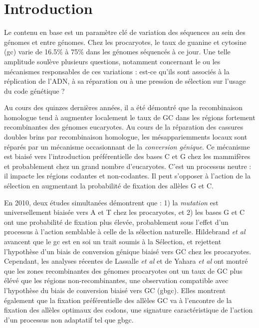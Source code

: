 \section*{Introduction}
\label{sec:introduction}

Le contenu en base est un paramètre clé de variation des séquences au sein des
génomes et entre génomes. Chez les procaryotes, le taux de guanine et cytosine
(\ac{gc}) varie de 16.5\% à 75\% dans les génomes séquencés à ce jour. Une telle
amplitude soulève plusieurs questions, notamment concernant le ou les mécanismes
responsables de ces variations : est-ce qu'ils sont associés à la réplication de
l'ADN, à sa réparation ou à une pression de sélection sur l'usage du code
génétique ?

Au cours des quinzes dernières années, il a été démontré que la recombinaison
homologue tend à augmenter localement le taux de GC dans les régions fortement
recombinantes des génomes
eucaryotes\cite{duret_biased_2009,lesecque_gc-biased_2013,williams_non-crossover_2015}.
Au cours de la réparation des cassures doubles brins par recombinaison
homologue, les mésappariemments locaux sont réparés par un mécanisme
occasionnant de la \emph{conversion génique}\cite{chen_gene_2007}. Ce mécanisme
est biaisé vers l'introduction préférentielle des bases C et G chez les
mammifères et probablement chez un grand nombre
d'eucaryotes\cite{pessia_evidence_2012}. C'est un processus neutre : il impacte
les régions codantes et non-codantes. Il peut s'opposer à l'action de la
sélection en augmentant la probabilité de fixation des allèles G et
C\cite{ratnakumar_detecting_2010}.

En 2010, deux études simultanées\cite{hildebrand_evidence_2010,
  hershberg_evidence_2010} démontrent que : 1) la \emph{mutation} est
universellement biaisée vers A et T chez les procaryotes, et 2) les bases G et C
ont une probabilité de fixation plus élevée, probablement sous l'effet d'un
processus à l'action semblable à celle de la sélection naturelle. Hildebrand
\emph{et al} avancent que le \ac{gc} est en soi un trait soumis à la Sélection,
et rejettent l'hypothèse d'un biais de conversion génique biaisé vers GC chez
les procaryotes. Cependant, les analyses récentes de Lassalle \emph{et al}
\cite{lassalle_gc-content_2015} et de Yahara \emph{et
  al}\cite{yahara_landscape_2016} ont montré que les zones recombinantes des
génomes procaryotes ont un taux de GC plus élévé que les régions
non-recombinantes, une observation compatible avec l'hypothèse du biais de
conversion biaisé vers GC (\ac{gbgc}). Elles montrent également que la fixation
préférentielle des allèles GC va à l'encontre de la fixation des allèles
optimaux des codons, une signature caractéristique de l'action d'un processus
non adaptatif tel que \ac{gbgc}.

\lipsum